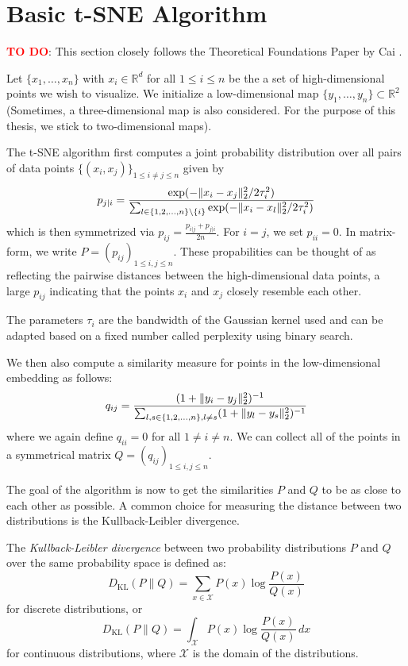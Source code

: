 \section{Basic t-SNE Algorithm}
\textcolor{red}{\textbf{TO DO}}: This section closely follows the Theoretical Foundations Paper by Cai \cite{JMLR:v23:21-0524}. 

Let $\{x_1, \dots , x_n \}$ with $x_i \in \mathbb{R}^d$ for all $1 \leq i \leq n$ be the a set of high-dimensional points we wish to visualize. We initialize a low-dimensional map $\{y_1, \dots , y_n\} \subset \mathbb{R}^2$ (Sometimes, a three-dimensional map is also considered. For the purpose of this thesis, we stick to two-dimensional maps). 

The t-SNE algorithm first computes a joint probability distribution over all pairs of data points $\{(x_i, x_j)\}_{1 \leq i \neq j \leq n}$ given by 
\begin{equation}
    p_{j|i} =  \frac{\exp(-\lVert x_i - x_j\rVert_2^2 / 2\tau_i^2)}{\sum_{l \in \{1,2, \dots, n\} \backslash \{i\}} \exp({-\lVert x_i - x_l\rVert_2^2 / 2 \tau_i^2})}
\end{equation}
which is then symmetrized via $p_{ij} = \frac{p_{i|j} + p_{j|i}}{2n}$. For $i=j$, we set $p_{ii}=0$. In matrix-form, we write $P = (p_{ij})_{1 \leq i, j \leq n}$. These propabilities can be thought of as reflecting the pairwise distances between the high-dimensional data points, a large $p_{ij}$ indicating that the points $x_i$ and $x_j$ closely resemble each other. 

The parameters $\tau_i$ are the bandwidth of the Gaussian kernel used and can be adapted based on a fixed number called perplexity using binary search. 

We then also compute a similarity measure for points in the low-dimensional embedding as follows: 
\begin{equation}
    q_{ij} = \frac{(1+ \lVert y_i - y_j\rVert_2^2)^{-1}}{\sum_{l, s \in \{1,2, \dots, n \}, l \neq s } (1+\lVert y_l - y_s\rVert_2^2)^{-1}}
\end{equation}
where we again define $q_{ii} = 0$ for all $1 \neq i \neq n$. We can collect all of the points in a symmetrical matrix $Q = (q_{ij})_{1 \leq i, j \leq n}$. 

The goal of the algorithm is now to get the similarities $P$ and $Q$ to be as close to each other as possible. A common choice for measuring the distance between two distributions is the Kullback-Leibler divergence. 

\begin{defi}
    The \emph{Kullback-Leibler divergence} between two probability distributions $P$ and $Q$ over the same probability space is defined as:
    \[
    D_{\text{KL}}(P \parallel Q) = \sum_{x \in \mathcal{X}} P(x) \log\frac{P(x)}{Q(x)}
    \]
    for discrete distributions, or
    \[
    D_{\text{KL}}(P \parallel Q) = \int_{\mathcal{X}} P(x) \log\frac{P(x)}{Q(x)} \, dx
    \]
    for continuous distributions, where \(\mathcal{X}\) is the domain of the distributions.
\end{defi}

